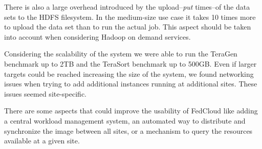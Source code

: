 

There is also a large overhead introduced by the upload--\emph{put} times--of the data sets to the HDFS filesystem. In the medium-size use case it takes 10 times more to upload the data set than to run the actual job. This aspect should be taken into account when considering Hadoop on demand services.

Considering the scalability of the system we were able to run the TeraGen benchmark up to 2TB and the TeraSort benchmark up to 500GB. Even if larger targets could be reached increasing the size of the system, we found networking issues when trying to add additional instances running at additional sites. These issues seemed site-specific.

There are some aspects that could improve the usability of FedCloud like adding a central workload management system, an automated way to distribute and synchronize the image between all sites, or a mechanism to query the resources available at a given site.






